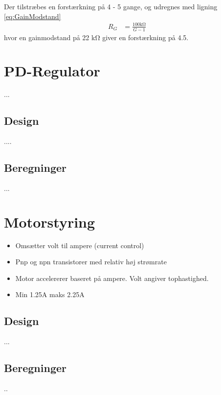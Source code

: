 Der tilstræbes en forstærkning på 4 - 5 gange, og udregnes med ligning \ref{eq:GainModstand}
\begin{align}
	R_G & = \frac{100 \si{\kilo\ohm}}{G-1} \label{eq:GainModstand}
\end{align}
hvor en gainmodstand på 22 \si{\kilo\ohm} giver en forstærkning på 4.5.

\section{PD-Regulator}
...
\subsection{Design}
....
\subsection{Beregninger}
...

\section{Motorstyring}\label{sec:sec_motorstyring}

\begin{itemize}
	\item Omsætter volt til ampere (current control)
	\item Pnp og npn transistorer med relativ høj strømrate
	\item Motor accelererer baseret på ampere. Volt angiver tophastighed.
	\item Min 1.25A maks 2.25A
\end{itemize}

\subsection{Design}
...

\subsection{Beregninger}
..
